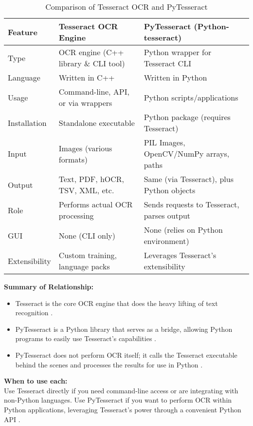 \documentclass{article}
\begin{document}
	\begin{table}[htbp]
		\centering
		\begin{tabular}{|l|l|l|}
			\hline
			\textbf{Feature} & \textbf{Tesseract OCR Engine} & \textbf{PyTesseract (Python-tesseract)} \\
			\hline
			Type & OCR engine (C++ library \& CLI tool) & Python wrapper for Tesseract CLI \\
			\hline
			Language & Written in C++ & Written in Python \\
			\hline
			Usage & Command-line, API, or via wrappers & Python scripts/applications \\
			\hline
			Installation & Standalone executable & Python package (requires Tesseract) \\
			\hline
			Input & Images (various formats) & PIL Images, OpenCV/NumPy arrays, paths \\
			\hline
			Output & Text, PDF, hOCR, TSV, XML, etc. & Same (via Tesseract), plus Python objects \\
			\hline
			Role & Performs actual OCR processing & Sends requests to Tesseract, parses output \\
			\hline
			GUI & None (CLI only) & None (relies on Python environment) \\
			\hline
			Extensibility & Custom training, language packs & Leverages Tesseract's extensibility \\
			\hline
		\end{tabular}
		\caption{Comparison of Tesseract OCR and PyTesseract}
	\end{table}
	
	\textbf{Summary of Relationship:}
	\begin{itemize}
		\item Tesseract is the core OCR engine that does the heavy lifting of text recognition \cite {Betterpath:2023, Restack:2025}.
		\item PyTesseract is a Python library that serves as a bridge, allowing Python programs to easily use Tesseract's capabilities \cite {Nutrient:2025, DataCamp:2024}.
		\item PyTesseract does not perform OCR itself; it calls the Tesseract executable behind the scenes and processes the results for use in Python \cite {GeekyAnts:2023}.
	\end{itemize}
	
	\textbf{When to use each:}\\
	Use Tesseract directly if you need command-line access or are integrating with non-Python languages. Use PyTesseract if you want to perform OCR within Python applications, leveraging Tesseract's power through a convenient Python API \cite {DataCamp:2024, Nutrient:2025}.
	
\end{document}
